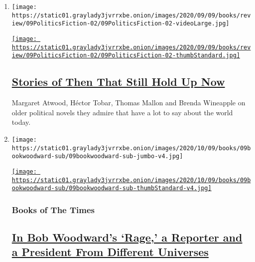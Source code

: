 \begin{enumerate}
\def\labelenumi{\arabic{enumi}.}
\item
  \texttt{[image: https://static01.graylady3jvrrxbe.onion/images/2020/09/09/books/review/09PoliticsFiction-02/09PoliticsFiction-02-videoLarge.jpg]}

  \href{/2020/09/11/books/review/political-novels-mephisto-klaus-mann-1876-gore-vidal-senor-presidente-miguel-angel-asturias-all-kings-men-robert-penn-warren.html}{\texttt{[image: https://static01.graylady3jvrrxbe.onion/images/2020/09/09/books/review/09PoliticsFiction-02/09PoliticsFiction-02-thumbStandard.jpg]}}

  \hypertarget{stories-of-then-that-still-hold-up-now}{%
  \subsection{\texorpdfstring{\href{/2020/09/11/books/review/political-novels-mephisto-klaus-mann-1876-gore-vidal-senor-presidente-miguel-angel-asturias-all-kings-men-robert-penn-warren.html}{Stories
  of Then That Still Hold Up
  Now}}{Stories of Then That Still Hold Up Now}}\label{stories-of-then-that-still-hold-up-now}}

  Margaret Atwood, Héctor Tobar, Thomas Mallon and Brenda Wineapple on
  older political novels they admire that have a lot to say about the
  world today.
\item
  \texttt{[image: https://static01.graylady3jvrrxbe.onion/images/2020/10/09/books/09bookwoodward-sub/09bookwoodward-sub-jumbo-v4.jpg]}

  \href{/2020/09/09/books/review-rage-donald-trump-bob-woodward.html}{\texttt{[image: https://static01.graylady3jvrrxbe.onion/images/2020/10/09/books/09bookwoodward-sub/09bookwoodward-sub-thumbStandard-v4.jpg]}}

  \hypertarget{books-of-the-times}{%
  \subsubsection{Books of The Times}\label{books-of-the-times}}

  \hypertarget{in-bob-woodwards-rage-a-reporter-and-a-president-from-different-universes}{%
  \subsection{\texorpdfstring{\href{/2020/09/09/books/review-rage-donald-trump-bob-woodward.html}{In
  Bob Woodward's `Rage,' a Reporter and a President From Different
  Universes}}{In Bob Woodward's `Rage,' a Reporter and a President From Different Universes}}\label{in-bob-woodwards-rage-a-reporter-and-a-president-from-different-universes}}


\end{enumerate}
